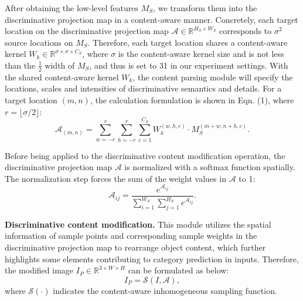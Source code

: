 \documentclass[letterpaper]{article} %
\begin{document}
After obtaining the low-level features $ M_S $, we transform them into the discriminative projection map in a content-aware manner. Concretely, each target location on the discriminative projection map $ \mathcal{A} \in \mathbb{R}^{H_S \times W_S} $ corresponds to $ \sigma^2 $ source locations on $ M_S $. Therefore, each target location shares a content-aware kernel $ W_k \in \mathbb{R}^{ \sigma \times \sigma \times C_S } $, where $ \sigma $ is the content-aware kernel size and is not less than the $ \frac{1}{2} $ width of $ M_S $, and thus is set to 31 in our experiment settings. With the shared content-aware kernel $ W_k $, the content parsing module will specify the locations, scales and intensities of discriminative semantics and details. For a target location $ (m, n) $, the calculation formulation is shown in Eqn. (1), where $ r = \lfloor \sigma/2\rfloor $:
\begin{equation}
\mathcal{A}_{(m,n)} = \sum_{w=-r}^r\sum_{h=-r}^r \sum_{c=1}^{C_S} W_k^{(w,h,c)} \cdot M_S^{(m+w, n+h,c)}.
\end{equation}

Before being applied to the discriminative content modification operation, the discriminative projection map $ \mathcal{A} $ is normalized with a softmax function spatially. The normalization step forces the sum of the weight values in $ \mathcal{A} $ to 1:
\begin{equation}
\mathcal{A}_{ij}= \frac{e^{\mathcal{A}_{ij}}}{\sum_{i=1}^{W_S}\sum_{j=1}^{H_S}e^{\mathcal{A}_{ij}}}.
\end{equation}

\textbf{Discriminative content modification.}
This module utilizes the spatial information of sample points and corresponding sample weights in the discriminative projection map to rearrange object content, which further highlights some elements contributing to category prediction in inputs. Therefore, the modified image $ I_P \in\mathbb{R}^{3\times W \times H} $ can be formulated as below:
\begin{equation}
I_P = \mathcal{S}(I, \mathcal{A}),
\end{equation}
where $ \mathcal{S}(\cdot) $ indicates the content-aware inhomogeneous sampling function.
\end{document}
